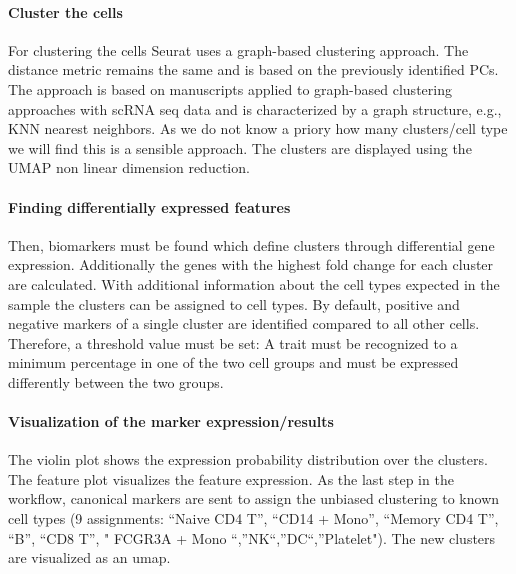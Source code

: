 \hypertarget{cluster-the-cells}{%
\paragraph{Cluster the cells}\label{cluster-the-cells}}

For clustering the cells Seurat uses a graph-based clustering approach.
The distance metric remains the same and is based on the previously
identified PCs. The approach is based on manuscripts applied to
graph-based clustering approaches with scRNA seq data and is
characterized by a graph structure, e.g., KNN nearest neighbors. As we
do not know a priory how many clusters/cell type we will find this is a
sensible approach. The clusters are displayed using the UMAP non linear
dimension reduction.

\hypertarget{finding-differentially-expressed-features}{%
\paragraph{Finding differentially expressed
features}\label{finding-differentially-expressed-features}}

Then, biomarkers must be found which define clusters through
differential gene expression. Additionally the genes with the highest
fold change for each cluster are calculated. With additional information
about the cell types expected in the sample the clusters can be assigned
to cell types. By default, positive and negative markers of a single
cluster are identified compared to all other cells. Therefore, a
threshold value must be set: A trait must be recognized to a minimum
percentage in one of the two cell groups and must be expressed
differently between the two groups.

\hypertarget{visualization-of-the-marker-expressionresults}{%
\paragraph{Visualization of the marker
expression/results}\label{visualization-of-the-marker-expressionresults}}

The violin plot shows the expression probability distribution over the
clusters. The feature plot visualizes the feature expression. As the
last step in the workflow, canonical markers are sent to assign the
unbiased clustering to known cell types (9 assignments: ``Naive CD4 T'',
``CD14 + Mono'', ``Memory CD4 T'', ``B'', ``CD8 T'', " FCGR3A + Mono
``,''NK``,''DC``,''Platelet"). The new clusters are visualized as an
umap.


